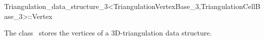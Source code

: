 

\begin{ccRefClass}{Triangulation_data_structure_3<TriangulationVertexBase_3,TriangulationCellBase_3>::Vertex}  %


\ccDefinition
  
The class \ccRefName\ stores the vertices of a 3D-triangulation data structure. 

\ccIsModel


\ccSeeAlso




\end{ccRefClass}



